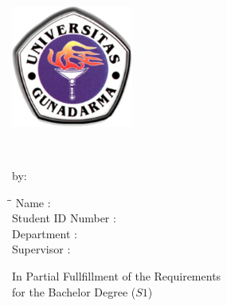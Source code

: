 \cleardoublepage
{}

\begin{titlepage}

\begin{adjustwidth}{0cm}{0cm}
\begin{center}

\large

\hfill

\vfill

\begingroup
{\LARGE
\textbf{\myUniUppercase} \\
\myFacultyLongUppercase \\
}
\endgroup

\vfill

\includegraphics[width=4cm]{include/logo} \\ \medskip

\vfill

\textbf{{\LARGE
\myTitleLineOne\\
\myTitleLineTwo
}}

\vfill

by:

\bigskip

\begin{minipage}[c]{\textwidth}
\begin{tabbing}
\hspace*{4cm}\=\hspace*{0.5cm}\= \kill
Name \>:\> \myName \\
Student ID Number \>:\> \myNPM \\
Department \>:\> \myDepartmentShort \\
Supervisor \>:\> \mySupervisor
\end{tabbing}
\end{minipage}

\bigskip

In Partial Fullfillment of the Requirements\\
for the Bachelor Degree ($S1$)

\bigskip

\myCityUppercase \\
\myYear \\

\vfill

\end{center}
\end{adjustwidth}

\end{titlepage}
